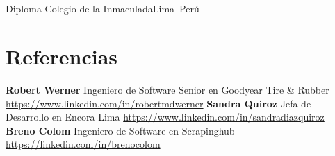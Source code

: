 \documentclass[11pt,a4paper,english]{moderncv}
\begin{document}
\subsection{}

    {Diploma}
    {Colegio de la Inmaculada}{Lima--Perú}
    {}{}

\subsection{}
\newpage

\section{Referencias}
\cvlistitem
{
    \textbf{Robert Werner}
    \newline{}
    Ingeniero de Software Senior en Goodyear Tire \& Rubber
    \newline{}
    \url{https://www.linkedin.com/in/robertmdwerner}
}
\cvlistitem
{
    \textbf{Sandra Quiroz}
    \newline{}
    Jefa de Desarrollo en Encora Lima
    \newline{}
    \url{https://www.linkedin.com/in/sandradiazquiroz}
}
\cvlistitem
{
    \textbf{Breno Colom}
    \newline{}
    Ingeniero de Software en Scrapinghub
    \newline{}
    \url{https://linkedin.com/in/brenocolom}
}
\end{document}
